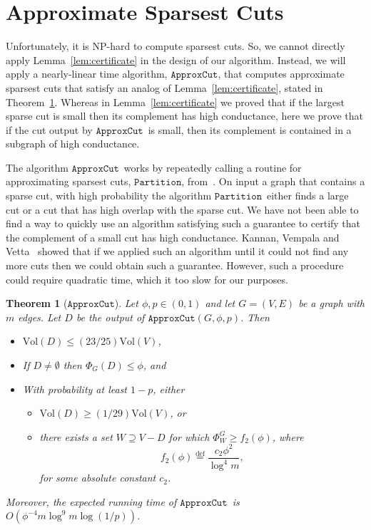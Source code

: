 \documentclass[11pt]{article}
\newtheorem{theorem}{Theorem}[section]
\newcommand{\approxcut}{\ensuremath{\mathtt{ApproxCut}}}
\newcommand{\partition}{\ensuremath{\mathtt{Partition}}}
\def\defeq{\stackrel{\mathrm{def}}{=}}
\def\vol#1{\mathrm{Vol}\left(#1  \right)}
\def\conduc#1#2{\Phi_{#1}\left(#2  \right)}
\def\Conducin#1{\Phi^{G}_{#1}}
\begin{document}
\section{Approximate Sparsest Cuts}\label{sec:approxCut}

Unfortunately, it is NP-hard to compute sparsest cuts.
So, we cannot directly
  apply Lemma~\ref{lem:certificate} in the design of our algorithm.
Instead, we will apply a nearly-linear time algorithm, \approxcut,
  that computes approximate sparsest cuts that satisfy an analog of
  Lemma~\ref{lem:certificate}, stated in Theorem~\ref{thm:ApproxCut}.
Whereas in Lemma~\ref{lem:certificate} we proved that if the largest sparse cut
  is small then its
  complement has high conductance,
  here we prove that if the cut output by \approxcut\ is small, then
  its complement is contained in a subgraph of high conductance.

The algorithm \approxcut \ works by repeatedly calling a routine
  for approximating sparsest cuts, \partition, from~\cite{SpielmanTengCuts}.
On input a graph that contains a sparse cut, with high probability
  the algorithm \partition \ either finds a large cut or a cut that has high overlap
  with the sparse cut.
We have not been able to find a way to quickly
   use an algorithm satisfying such a guarantee
  to certify that the complement of a small cut has high conductance.
Kannan, Vempala and Vetta~\cite{KannanVempalaVetta} showed that if we applied
  such an algorithm until it could not find any more cuts then we
  could obtain such a guarantee.
However, such a procedure could require quadratic time, which it too
  slow for our purposes.

\begin{theorem}[\approxcut]\label{thm:ApproxCut}
Let $\phi, p \in (0,1)$ and let $G = (V,E)$ be a graph with $m$ edges.
Let $D$ be the output of $\approxcut (G, \phi , p)$.
Then
\begin{itemize}
\item [(A.1)] $\vol{D} \leq (23/25) \vol{V}$,
\item [(A.2)] If $D \not = \emptyset$ then $\conduc{G}{D} \leq  \phi $, and
\item [(A.3)] With probability at least $1-p$, either
\begin{itemize}
\item [(A.3.a)] $\vol{D} \geq (1/29) \vol{V}$, or
\item [(A.3.b)] there exists a set $W \supseteq V-D$ for which
  $\Conducin{W} \geq f_{2} (\phi)$, where
\begin{equation}\label{eqn:f4}
  f_{2} (\phi) \defeq \frac{c_{2} \phi^{2}}{\log^{4} m},
\end{equation}
for some absolute constant $c_{2}$.
\end{itemize}
\end{itemize}
Moreover, the expected running time of \approxcut\  is 
  $O \left(\phi^{-4}m \log^{9} m \log (1/p) \right) $.
\end{theorem}
\end{document}
